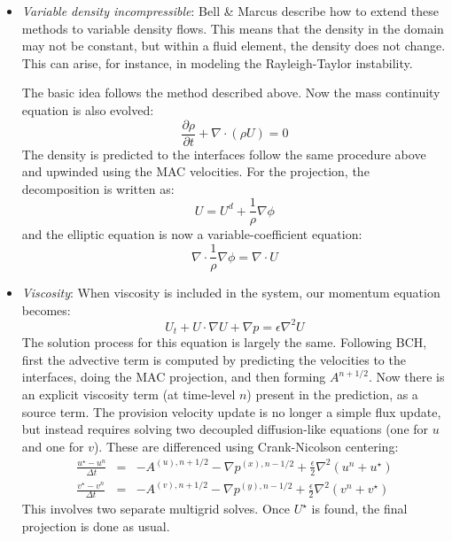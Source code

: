 \begin{itemize}

\item {\em Variable density incompressible}: Bell \& Marcus
  \cite{BellMarcus} describe how to extend these methods to variable
  density flows.  This means that the density in the domain may not be
  constant, but within a fluid element, the density does not change.
  This can arise, for instance, in modeling the Rayleigh-Taylor
  instability.

  The basic idea follows the method described above.  Now the 
  mass continuity equation is also evolved:
  \begin{equation}
  \frac{\partial \rho}{\partial t} + \nabla \cdot (\rho U) = 0
  \end{equation}
  The density is predicted to the interfaces follow the same procedure
  above and upwinded using the MAC velocities.
  For the projection, the decomposition is written as:
  \begin{equation}
  U = U^d + \frac{1}{\rho}\nabla \phi
  \end{equation}
  and the elliptic equation is now a variable-coefficient equation:
  \begin{equation}
  \nabla \cdot \frac{1}{\rho} \nabla \phi = \nabla \cdot U
  \end{equation}

\item {\em Viscosity}: When viscosity is included in the system, our
  momentum equation becomes:
  \begin{equation}
  U_t + U\cdot \nabla U + \nabla p = \epsilon \nabla^2 U
  \end{equation}
  The solution process for this equation is largely the same.
  Following BCH, first the advective term is computed by predicting
  the velocities to the interfaces, doing the MAC projection, and then
  forming $A^{n+1/2}$.  Now there is an explicit viscosity term (at
  time-level $n$) present in the prediction, as a source term.  The
  provision velocity update is no longer a simple flux update, but
  instead requires solving two decoupled diffusion-like equations (one
  for $u$ and one for $v$).  These are differenced using
  Crank-Nicolson centering:
  \begin{eqnarray}
  \frac{u^\star - u^n}{\Delta t} &=& - A^{(u),n+1/2} - \nabla p^{(x),n-1/2} 
       + \frac{\epsilon }{2} \nabla^2 (u^n + u^\star) \\
  \frac{v^\star - v^n}{\Delta t} &=& - A^{(v),n+1/2} - \nabla p^{(y),n-1/2} 
       + \frac{\epsilon }{2} \nabla^2 (v^n + v^\star) 
  \end{eqnarray}
  This involves two separate multigrid solves.  Once $U^\star$ is found,
  the final projection is done as usual.


\end{itemize}
